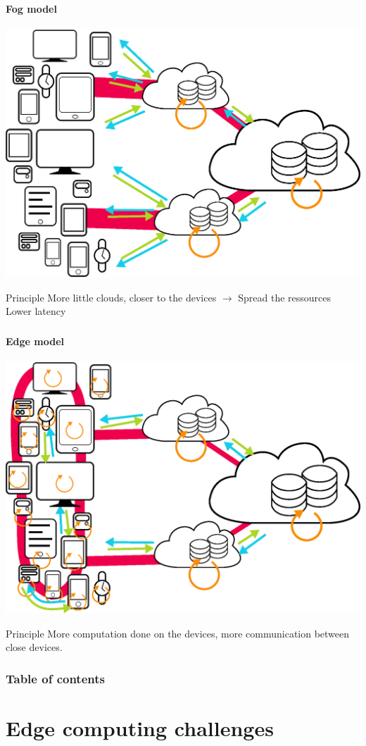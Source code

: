 \documentclass[utf8,xcolor=table, page number]{earlywinter}
\begin{document}
\begin{frame}
	\frametitle{\secname}
  \framesubtitle{Fog model}
  \begin{center}
    \includegraphics[width=0.6\linewidth]{fog.eps}
  \end{center}
  \begin{block}{Principle}
    More little clouds, closer to the devices $\to$ Spread the ressources\\
    Lower latency
  \end{block}
\end{frame}
\begin{frame}
	\frametitle{\secname}
  \framesubtitle{Edge model}
  \begin{center}
    \includegraphics[width=0.6\linewidth]{edge.eps}
  \end{center}
  \begin{block}{Principle}
    More computation done on the devices, more communication between close devices.
  \end{block}
\end{frame}

  \begin{frame}
    \frametitle{Table of contents}
    \tableofcontents[]
  \end{frame}
  
  
\section{Edge computing challenges}
\end{document}
